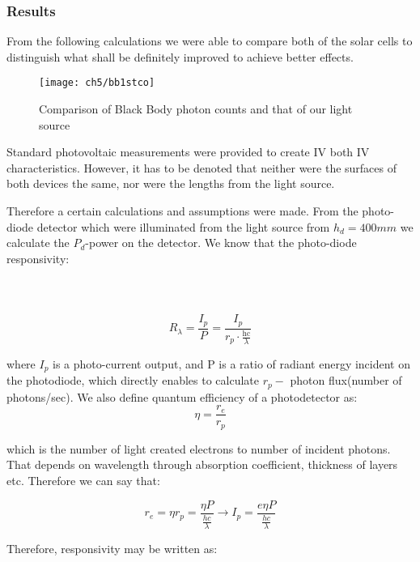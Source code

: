 \subsubsection{Results}
From the following calculations we were able to compare both of the solar cells to distinguish what shall be definitely improved to achieve better effects. 
\begin{wrapfigure}{l}{0.451\textwidth}
\center
\texttt{[image: ch5/bb1stco]}
\caption{Comparison of Black Body photon counts and that of our light source}
\end{wrapfigure}
Standard photovoltaic measurements were provided to create IV both IV characteristics. However, it has to be denoted that neither were the surfaces of both devices the same, nor were the lengths from the light source. 

\noindent Therefore a certain calculations and assumptions were made. From the
photo-diode detector which were illuminated from the light source from
\(h_{d} = 400mm\) we calculate the \(P_{d}\)-power on the detector. We know that the photo-diode responsivity: \\ \\ \\ \\ 

\begin{equation}
R_{\lambda} = \frac{I_{p}}{P} = \frac{I_{p}}{r_{p} \cdot \frac{\text{hc}}{\lambda}}
\end{equation}


\noindent where \(I_{p}\) is a photo-current output, and P is a ratio of radiant
energy incident on the photodiode, which directly enables to calculate
\(r_{p} -\) photon flux(number of photons/sec). We also define quantum
efficiency of a photodetector as:
\begin{equation}
\eta = \frac{r_{e}}{r_{p}}
\end{equation}


\noindent which is the number of light created electrons to number of incident
photons. That depends on wavelength through absorption coefficient,
thickness of layers etc. Therefore we can say that:

\begin{equation}
r_{e} = \eta r_{p} = \frac{\eta P}{\frac{hc}{\lambda}} \rightarrow I_{p} = \frac{e\eta P}{\frac{hc}{\lambda}}
\end{equation}


\noindent Therefore, responsivity may be written as:

